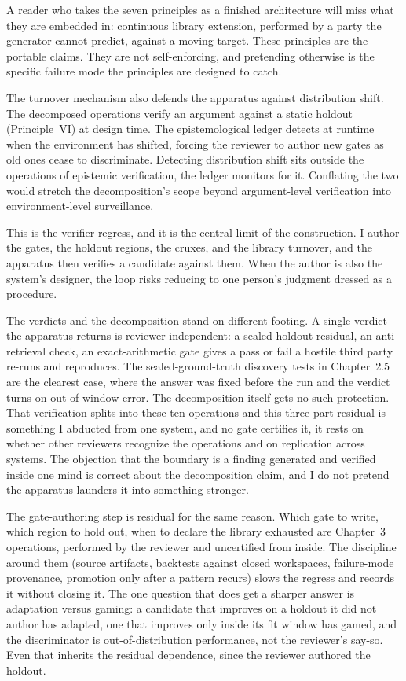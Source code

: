 \documentclass[
  11pt,
]{article}
\begin{document}
A reader who takes the seven principles as a finished architecture will
miss what they are embedded in: continuous library
extension, performed by a party the generator cannot predict, against a
moving target. These principles are the portable claims. They are not
self-enforcing, and pretending otherwise is the specific failure mode
the principles are designed to catch.

The turnover mechanism also defends the apparatus against
distribution shift. The decomposed operations verify an argument against
a static holdout (Principle~VI) at design time. The epistemological ledger
detects at runtime when the environment has shifted, forcing the
reviewer to author new gates as old ones cease to discriminate.
Detecting distribution shift sits outside the operations of epistemic
verification, the ledger monitors for it. Conflating the
two would stretch the decomposition's scope beyond argument-level
verification into environment-level surveillance.

This is the verifier regress, and it is the central limit of the
construction. I author the gates, the holdout regions, the cruxes, and the
library turnover, and the apparatus then verifies a candidate against them.
When the author is also the system's designer, the loop risks reducing to
one person's judgment dressed as a procedure.

The verdicts and the decomposition stand on different footing. A single verdict the apparatus returns
is reviewer-independent: a sealed-holdout residual, an anti-retrieval
check, an exact-arithmetic gate gives a pass or fail a hostile third party
re-runs and reproduces. The sealed-ground-truth discovery tests in
Chapter~2.5 are the clearest case, where the answer was fixed before the
run and the verdict turns on out-of-window error. The decomposition itself
gets no such protection. That verification splits into these ten
operations and this three-part residual is something I abducted from one
system, and no gate certifies it, it rests on whether other reviewers
recognize the operations and on replication across systems. The objection
that the boundary is a finding generated and verified inside one mind is
correct about the decomposition claim, and I do not pretend the apparatus
launders it into something stronger.

The gate-authoring step is residual for the same reason. Which gate to
write, which region to hold out, when to declare the library exhausted are
Chapter~3 operations, performed by the reviewer and uncertified from
inside. The discipline around them (source artifacts, backtests against
closed workspaces, failure-mode provenance, promotion only after a pattern
recurs) slows the regress and records it without closing it. The one
question that does get a sharper answer is adaptation versus gaming: a
candidate that improves on a holdout it did not author has adapted, one
that improves only inside its fit window has gamed, and the discriminator
is out-of-distribution performance, not the reviewer's say-so. Even that
inherits the residual dependence, since the reviewer authored the holdout.
\end{document}
